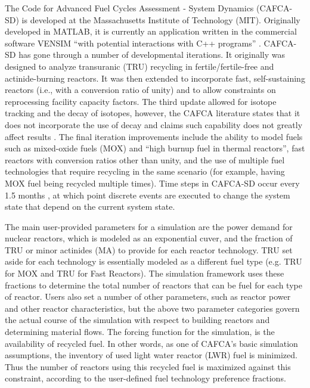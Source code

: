 The Code for Advanced Fuel Cycles Assessment - System Dynamics (CAFCA-SD) is
developed at the Massachusetts Institute of Technology (MIT). Originally
developed in MATLAB, it is currently an application written in the commercial
software VENSIM \cite{vensim_2010_ventana} ``with potential interactions with
C++ programs'' \cite{guerin_benchmark_2009}. CAFCA-SD has gone through a number
of developmental iterations. It originally was designed to analyze transuranic
(TRU) recycling in fertile/fertile-free and actinide-burning reactors. It was
then extended to incorporate fast, self-sustaining reactors (i.e., with a
conversion ratio of unity) and to allow constraints on reprocessing facility
capacity factors. The third update allowed for isotope tracking and the decay of
isotopes, however, the CAFCA literature states that it does not incorporate the
use of decay and claims such capability does not greatly affect results
\cite{guerin_impact_2009,guerin_benchmark_2009}. The final iteration
improvements include the ability to model fuels such as mixed-oxide fuels (MOX)
and ``high burnup fuel in thermal reactors'', fast reactors with conversion
ratios other than unity, and the use of multiple fuel technologies that require
recycling in the same scenario (for example, having MOX fuel being recycled
multiple times). Time steps in CAFCA-SD occur every 1.5
months \cite{guerin_impact_2009}, at which point discrete events are executed to
change the system state that depend on the current system state.

The main user-provided parameters for a simulation are the power demand for
nuclear reactors, which is modeled as an exponential cuver, and the fraction of
TRU or minor actinides (MA) to provide for each reactor technology. TRU set
aside for each technology is essentially modeled as a different fuel type
(e.g. TRU for MOX and TRU for Fast Reactors). The simulation framework uses
these fractions to determine the total number of reactors that can be fuel for
each type of reactor. Users also set a number of other parameters, such as
reactor power and other reactor characteristics, but the above two parameter
categories govern the actual course of the simulation with respect to building
reactors and determining material flows. The forcing function for the
simulation, is the availability of recycled fuel. In other words, as one of
CAFCA's basic simulation assumptions, the inventory of used light water reactor
(LWR) fuel is minimized. Thus the number of reactors using this recycled fuel is
maximized against this constraint, according to the user-defined fuel technology
preference fractions. 

